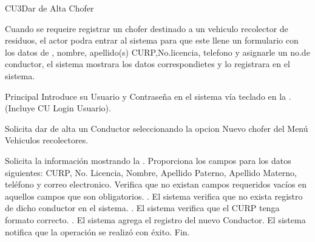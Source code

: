 \begin{UseCase}{CU3}{Dar de Alta Chofer}{
	Cuando se requeire registrar un chofer destinado a un vehiculo recolector de residuos, el actor podra entrar al sistema para que este llene un formulario con los datos de , nombre, apellido(s) CURP,No.licencia, telefono y asignarle un no.de conductor, el sistema mostrara los datos correspondietes y lo registrara en el sistema.


}
	
\end{UseCase}

\begin{UCtrayectoria}{Principal}
	\UCpaso[\UCactor] Introduce su Usuario  y Contraseña en el sistema vía teclado en la  .(Incluye CU Login Usuario).
	
	\UCpaso[\UCactor] Solicita dar de alta un Conductor seleccionando la opcion Nuevo chofer  del Menú Vehiculos recolectores.
	
	
	\UCpaso Solicita la información mostrando la .
	\UCpaso[\UCactor] Proporciona los campos para  los datos siguientes: CURP, No. Licencia, Nombre, Apellido Paterno, Apellido Materno, teléfono y correo electronico.
	\UCpaso Verifica que no existan campos requeridos vacíos  en aquellos campos que son obligatorios. .
	\UCpaso El sistema verifica que no exista registro de dicho conductor en el sistema. .
	\UCpaso El sistema verifica que el CURP tenga formato correcto. .
	\UCpaso El sistema agrega el registro del nuevo Conductor.
	\UCpaso El sistema notifica que la operación se realizó con éxito.
	\UCpaso Fin.
	
	
\end{UCtrayectoria}
	
